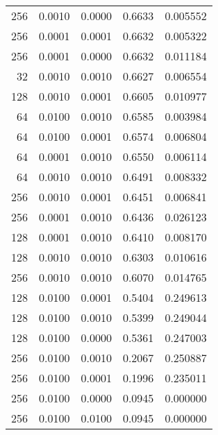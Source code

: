 \begin{tabular}{rrrrr}
 256 &  0.0010 &  0.0000 &  0.6633 &  0.005552 \\
 256 &  0.0001 &  0.0001 &  0.6632 &  0.005322 \\
 256 &  0.0001 &  0.0000 &  0.6632 &  0.011184 \\
  32 &  0.0010 &  0.0010 &  0.6627 &  0.006554 \\
 128 &  0.0010 &  0.0001 &  0.6605 &  0.010977 \\
  64 &  0.0100 &  0.0010 &  0.6585 &  0.003984 \\
  64 &  0.0100 &  0.0001 &  0.6574 &  0.006804 \\
  64 &  0.0001 &  0.0010 &  0.6550 &  0.006114 \\
  64 &  0.0010 &  0.0010 &  0.6491 &  0.008332 \\
 256 &  0.0010 &  0.0001 &  0.6451 &  0.006841 \\
 256 &  0.0001 &  0.0010 &  0.6436 &  0.026123 \\
 128 &  0.0001 &  0.0010 &  0.6410 &  0.008170 \\
 128 &  0.0010 &  0.0010 &  0.6303 &  0.010616 \\
 256 &  0.0010 &  0.0010 &  0.6070 &  0.014765 \\
 128 &  0.0100 &  0.0001 &  0.5404 &  0.249613 \\
 128 &  0.0100 &  0.0010 &  0.5399 &  0.249044 \\
 128 &  0.0100 &  0.0000 &  0.5361 &  0.247003 \\
 256 &  0.0100 &  0.0010 &  0.2067 &  0.250887 \\
 256 &  0.0100 &  0.0001 &  0.1996 &  0.235011 \\
 256 &  0.0100 &  0.0000 &  0.0945 &  0.000000 \\
 256 &  0.0100 &  0.0100 &  0.0945 &  0.000000 \\
\bottomrule
\end{tabular}
